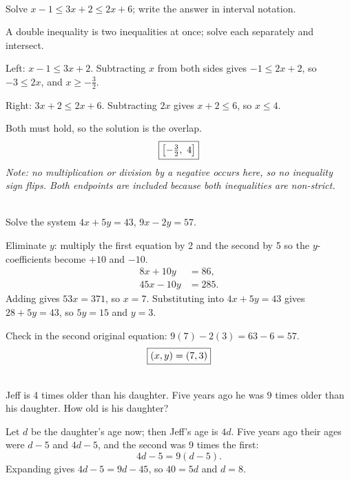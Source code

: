 \documentclass[11pt]{article}
\begin{document}
\begin{questions}

\item {}\\
  Solve $x - 1 \le 3x + 2 \le 2x + 6$; write the answer in interval notation.
  \begin{solution}
    A double inequality is two inequalities at once; solve each separately and intersect.

    Left: $x - 1 \le 3x + 2$. Subtracting $x$ from both sides gives $-1 \le 2x + 2$,
    so $-3 \le 2x$, and $x \ge -\tfrac{3}{2}$.

    Right: $3x + 2 \le 2x + 6$. Subtracting $2x$ gives $x + 2 \le 6$, so $x \le 4$.

    Both must hold, so the solution is the overlap.
    \[ \fbox{$\displaystyle \left[-\tfrac{3}{2},\ 4\right]$} \]
    \textit{Note: no multiplication or division by a negative occurs here, so no inequality
    sign flips. Both endpoints are included because both inequalities are non-strict.}
  \end{solution}

\item {}\\
  Solve the system $4x + 5y = 43$, $9x - 2y = 57$.
  \begin{solution}
    Eliminate $y$: multiply the first equation by 2 and the second by 5 so the
    $y$-coefficients become $+10$ and $-10$.
    \[
      \begin{aligned}
        8x + 10y &= 86,\\
        45x - 10y &= 285.
      \end{aligned}
    \]
    Adding gives $53x = 371$, so $x = 7$. Substituting into $4x + 5y = 43$ gives
    $28 + 5y = 43$, so $5y = 15$ and $y = 3$.

    Check in the second original equation: $9(7) - 2(3) = 63 - 6 = 57$. \checkmark
    \[ \fbox{$\displaystyle (x,y) = (7,3)$} \]
  \end{solution}

\item {}\\
  Jeff is 4 times older than his daughter. Five years ago he was 9 times older than his
  daughter. How old is his daughter?
  \begin{solution}
    Let $d$ be the daughter's age now; then Jeff's age is $4d$. Five years ago their ages
    were $d - 5$ and $4d - 5$, and the second was 9 times the first:
    \[ 4d - 5 = 9(d - 5). \]
    Expanding gives $4d - 5 = 9d - 45$, so $40 = 5d$ and $d = 8$.


\end{solution}
\end{questions}
\end{document}
